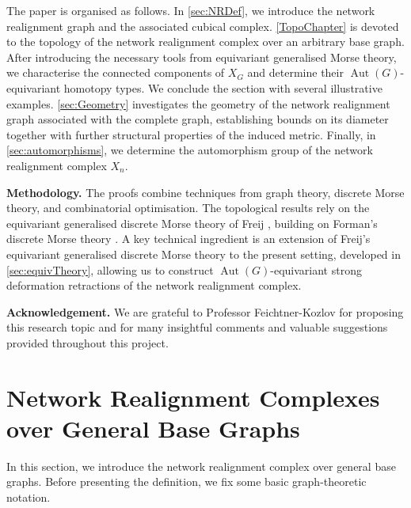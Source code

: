 \documentclass[reqno,dvipsnames]{amsart}
\theoremstyle{plain}
\numberwithin{equation}{section}
\theoremstyle{definition}
\DeclareMathOperator{\Aut}{Aut}
\begin{document}
The paper is organised as follows. In \autoref{sec:NRDef}, we introduce the network realignment graph and the associated cubical complex. \autoref{TopoChapter} is devoted to the topology of the network realignment complex over an arbitrary base graph. After introducing the necessary tools from equivariant generalised Morse theory, we characterise the connected components of $X_G$ and determine their $\Aut(G)$-equivariant homotopy types. We conclude the section with several illustrative examples. \autoref{sec:Geometry} investigates the geometry of the network realignment graph associated with the complete graph, establishing bounds on its diameter together with further structural properties of the induced metric. Finally, in \autoref{sec:automorphisms}, we determine the automorphism group of the network realignment complex $X_n$.

\bigskip

\noindent\textbf{Methodology.} The proofs combine techniques from graph theory, discrete Morse theory, and combinatorial optimisation. The topological results rely on the equivariant generalised discrete Morse theory of Freij \cite{Freij}, building on Forman's discrete Morse theory \cite{Forman}. A key technical ingredient is an extension of Freij's equivariant generalised discrete Morse theory to the present setting, developed in \autoref{sec:equivTheory}, allowing us to construct $\Aut(G)$-equivariant strong deformation retractions of the network realignment complex.

\bigskip

\noindent\textbf{Acknowledgement.} We are grateful to Professor Feichtner-Kozlov for proposing this research topic and for many insightful comments and valuable suggestions provided throughout this project.

\newpage

\tableofcontents

\section{Network Realignment Complexes over General Base Graphs}\label{sec:NRDef}

In this section, we introduce the network realignment complex over general base graphs. Before presenting the definition, we fix some basic graph-theoretic notation.
\end{document}
